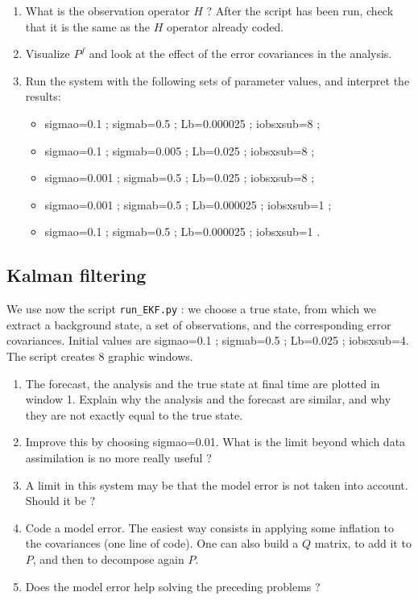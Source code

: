 \documentclass[11pt,a4paper]{article}
\begin{document}
\begin{enumerate}
\item What is the observation operator $H$ ?  After the script has been run, check that it is the same as the $H$ operator already coded.
\item Visualize $P^f$ and look at the effect of the error covariances in the analysis. 
\item Run the system with the following sets of parameter values, and interpret the results:
   \begin{itemize}
    \item sigmao=0.1 ; sigmab=0.5 ; Lb=0.000025 ; iobsxsub=8 ;
    \item sigmao=0.1 ; sigmab=0.005 ; Lb=0.025 ; iobsxsub=8 ;
    \item sigmao=0.001 ; sigmab=0.5 ; Lb=0.025 ; iobsxsub=8 ;
    \item sigmao=0.001 ; sigmab=0.5 ; Lb=0.000025 ; iobsxsub=1 ;
    \item sigmao=0.1 ; sigmab=0.5 ; Lb=0.000025 ; iobsxsub=1 .
   \end{itemize}
\end{enumerate}

\subsection{Kalman filtering}

We use now the
script \texttt{run\_EKF.py} :  we choose a true state, from which we extract a background state, a set of observations, and the corresponding error covariances.
Initial values are sigmao=0.1 ; sigmab=0.5 ; Lb=0.025 ; iobsxsub=4.
The script creates 8 graphic windows. \\

\begin{enumerate}
  \item The forecast, the analysis and the true state at final time are plotted in window 1. Explain why the analysis and the forecast are similar, and why they are not exactly equal to the true state. 
\item Improve this by choosing sigmao=0.01. What is the limit beyond which data assimilation is no more really useful ? 
 \item A limit in this system may be that the model error is not taken into account. Should it be ? 
 \item Code a model error. The easiest way consists in applying some inflation to the covariances (one line of code). One can also build a  $Q$ matrix, to add it to $P$, and then to decompose again $P$.
 \item Does the model error help solving the preceding problems ?

\end{enumerate}
\end{document}
